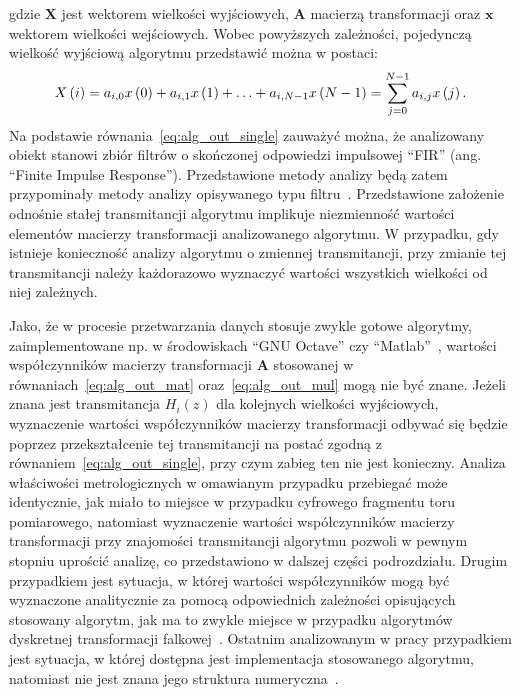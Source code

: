gdzie $\mathbf{X}$ jest wektorem wielkości wyjściowych, $\mathbf{A}$ macierzą transformacji oraz $\mathbf{x}$ wektorem wielkości wejściowych. Wobec powyższych zależności, pojedynczą wielkość wyjściową algorytmu przedstawić można w postaci:
\begin{equation}
X \left(i\right) = a_{i, 0} x \left(0\right) + a_{i, 1} x \left(1\right) + \hdots + a_{i, N-1} x \left(N-1\right) = \sum _{j = 0} ^{N-1} a_{i,j} x \left(j\right) \label{eq:alg_out_single}.
\end{equation}
Na podstawie równania~\eqref{eq:alg_out_single} zauważyć można, że analizowany obiekt stanowi zbiór filtrów o skończonej odpowiedzi impulsowej \enquote{FIR} (ang. \enquote{Finite Impulse Response}). Przedstawione metody analizy będą zatem przypominały metody analizy opisywanego typu filtru~\cite{mehrnia_fir}. Przedstawione założenie odnośnie stałej transmitancji algorytmu implikuje niezmienność wartości elementów macierzy transformacji analizowanego algorytmu. W przypadku, gdy istnieje konieczność analizy algorytmu o zmiennej transmitancji, przy zmianie tej transmitancji należy każdorazowo wyznaczyć wartości wszystkich wielkości od niej zależnych.

Jako, że w procesie przetwarzania danych stosuje zwykle gotowe algorytmy, zaimplementowane np. w środowiskach \enquote{GNU Octave} czy \enquote{Matlab}~\cite{pruuvsa_dwt, lee_pywavelets}, wartości współczynników macierzy transformacji $\mathbf{A}$ stosowanej w równaniach~\eqref{eq:alg_out_mat} oraz~\eqref{eq:alg_out_mul} mogą nie być znane. Jeżeli znana jest transmitancja $H_{i}(z)$ dla kolejnych wielkości wyjściowych, wyznaczenie wartości współczynników macierzy transformacji odbywać się będzie poprzez przekształcenie tej transmitancji na postać zgodną z równaniem~\eqref{eq:alg_out_single}, przy czym zabieg ten nie jest konieczny. Analiza właściwości metrologicznych w omawianym przypadku przebiegać może identycznie, jak miało to miejsce w przypadku cyfrowego fragmentu toru pomiarowego, natomiast wyznaczenie wartości współczynników macierzy transformacji przy znajomości transmitancji algorytmu pozwoli w pewnym stopniu uprościć analizę, co przedstawiono w dalszej części podrozdziału. Drugim przypadkiem jest sytuacja, w której wartości współczynników mogą być wyznaczone analitycznie za pomocą odpowiednich zależności opisujących stosowany algorytm, jak ma to zwykle miejsce w przypadku algorytmów dyskretnej transformacji falkowej~\cite{vonesch_dbbasics}. Ostatnim analizowanym w pracy przypadkiem jest sytuacja, w której dostępna jest implementacja stosowanego algorytmu, natomiast nie jest znana jego struktura numeryczna~\cite{misiti_matlabwav}.

